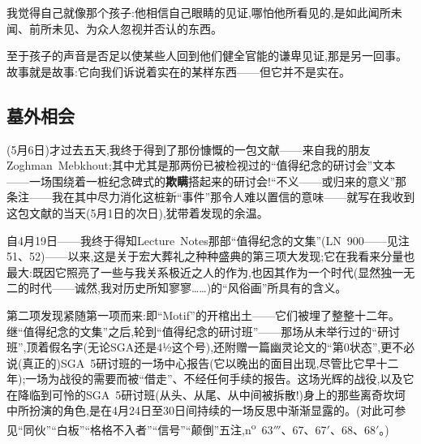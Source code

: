 我觉得自己就像那个孩子:他相信自己眼睛的见证,哪怕他所看见的,是如此闻所未闻、前所未见、为众人忽视并否认的东西。

\dmark{}至于孩子的声音是否足以使某些人回到他们健全官能的谦卑见证,那是另一回事。故事就是故事:它向我们诉说着实在的某样东西——但它并不是实在。

\subsection{墓外相会}


(5月6日)才过去五天,我终于得到了那份慷慨的一包文献——来自我的朋友Zoghman~Mebkhout;其中尤其是那两份已被检视过的“值得纪念的研讨会”文本——一场围绕着一桩纪念碑式的\textbf{欺瞒}搭起来的研讨会!“不义——或归来的意义”那条注——我在其中尽力消化这桩新“事件”那令人难以置信的意味——就写在我收到这包文献的当天(5月1日的次日),犹带着发现的余温。

自4月19日——我终于得知Lecture~Notes那部“值得纪念的文集”(LN~900——见注51、52)——以来,这是关于宏大葬礼之种种盛典的第三项大发现;它在我看来分量也最大:既因它照亮了一些与我关系极近之人的作为,也因其作为一个时代(显然独一无二的时代——诚然,我对历史所知寥寥……)的“风俗画”所具有的含义。

第二项发现紧随第一项而来:即“Motif”的开棺\dmark{}出土——它们被埋了整整十二年。继“值得纪念的文集”之后,轮到“值得纪念的研讨班”——那场从未举行过的“研讨班”,顶着假名字(无论SGA还是4½这个号),还附赠一篇幽灵论文的“第0状态”,更不必说(真正的)SGA~5研讨班的一场中心报告(它以晚出的面目出现,尽管比它早十二年);一场为战役的需要而被“借走”、不经任何手续的报告。这场光辉的战役,以及它在降临到可怜的SGA~5研讨班(从头、从尾、从中间被拆散!)身上的那些离奇坎坷中所扮演的角色,是在4月24日至30日间持续的一场反思中渐渐显露的。(对此可参见“同伙”“白板”“格格不入者”“信号”“颠倒”五注,n\textsuperscript{o}~63$'''$、67、67$'$、68、68$'$。)


